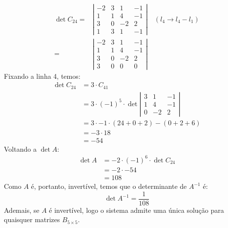 \begin{align*}
    \det C_{24} = &\left|\begin{array}{cccc}
         -2 & 3 & 1 & -1 \\
         1 & 1 & 4 & -1 \\
         3 & 0 & -2 & 2 \\
         1 & 3 & 1 & -1
    \end{array}\right| \quad (l_4 \rightarrow l_4 - l_1) \\
    = &\left|\begin{array}{cccc}
         -2 & 3 & 1 & -1 \\
         1 & 1 & 4 & -1 \\
         3 & 0 & -2 & 2 \\
         3 & 0 & 0 & 0
    \end{array}\right| 
\end{align*}
Fixando a linha 4, temos:
\begin{align*}
    \det C_{24} &= 3 \cdot C_{41} \\
    &= 3 \cdot (-1)^5 \cdot \det \left|\begin{array}{ccc}
         3 & 1 & -1 \\
         1 & 4 & -1 \\
         0 & -2 & 2
    \end{array}\right| \\
    &= 3 \cdot -1 \cdot (24 + 0 + 2) - (0 + 2 + 6) \\
    &= -3 \cdot 18 \\
    &= -54
\end{align*}
Voltando a $\det A$:
\begin{align*}
    \det A &= -2 \cdot (-1)^{6} \cdot \det C_{24} \\ 
    &= -2 \cdot -54 \\ 
    &= 108
\end{align*}
Como $A$ é, portanto, invertível, temos que o determinante de $A^{-1}$ é:
\begin{displaymath}
    \det A^{-1} = \frac{1}{108}
\end{displaymath}
Ademais, se $A$ é invertível, logo o sistema admite uma única solução para quaisquer matrizes $B_{5\times5}.$ 